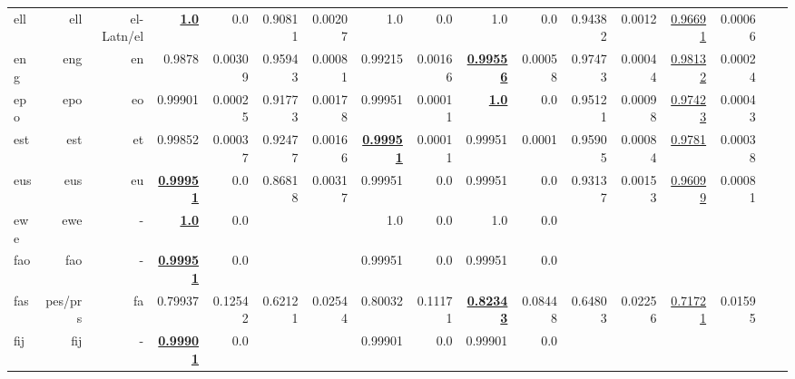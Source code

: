 \documentclass[11pt]{article}
\begin{document}
\begin{table*}[h]
{\begin{tabular}{lrrrrrrrrrrrrrrrr}
ell         & ell         & el-Latn/el         & \textbf{\underline{1.0}}         & 0.0         & 0.90811         & 0.00207         & 1.0         & 0.0         & 1.0         & 0.0         & 0.94382         & 0.0012         & \underline{0.96691}         & 0.00066         \\
eng         & eng         & en         & 0.9878         & 0.00309         & 0.95943         & 0.00081         & 0.99215         & 0.00166         & \textbf{\underline{0.99556}}         & 0.00058         & 0.97473         & 0.00044         & \underline{0.98132}         & 0.00024         \\
epo         & epo         & eo         & 0.99901         & 0.00025         & 0.91773         & 0.00178         & 0.99951         & 0.00011         & \textbf{\underline{1.0}}         & 0.0         & 0.95121         & 0.00098         & \underline{0.97423}         & 0.00043         \\
est         & est         & et         & 0.99852         & 0.00037         & 0.92477         & 0.00166         & \textbf{\underline{0.99951}}         & 0.00011         & 0.99951         & 0.0001         & 0.95905         & 0.00084         & \underline{0.9781}         & 0.00038         \\
eus         & eus         & eu         & \textbf{\underline{0.99951}}         & 0.0         & 0.86818         & 0.00317         & 0.99951         & 0.0         & 0.99951         & 0.0         & 0.93137         & 0.00153         & \underline{0.96099}         & 0.00081         \\
ewe         & ewe         & -         & \textbf{\underline{1.0}}         & 0.0         &          &          & 1.0         & 0.0         & 1.0         & 0.0         &          &          &          &          \\
fao         & fao         & -         & \textbf{\underline{0.99951}}         & 0.0         &          &          & 0.99951         & 0.0         & 0.99951         & 0.0         &          &          &          &          \\
fas         & pes/prs         & fa         & 0.79937         & 0.12542         & 0.62121         & 0.02544         & 0.80032         & 0.11171         & \textbf{\underline{0.82343}}         & 0.08448         & 0.64803         & 0.02256         & \underline{0.71721}         & 0.01595         \\
fij         & fij         & -         & \textbf{\underline{0.99901}}         & 0.0         &          &          & 0.99901         & 0.0         & 0.99901         & 0.0         &          &          &          &          \\

\end{tabular}}
\end{table*}
\end{document}
